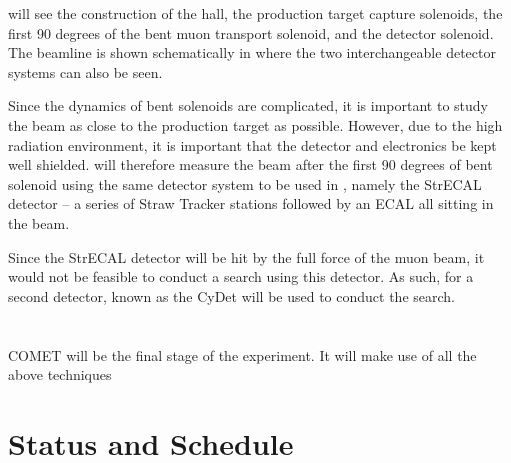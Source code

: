 \phaseI will see the construction of the \COMET hall, the production target capture solenoids, the first 90 degrees of the bent muon transport solenoid, and the detector solenoid.  
The beamline is shown schematically in  where the two interchangeable detector systems can also be seen.

Since the dynamics of bent solenoids are complicated, it is important to study the beam as close to the production target as possible.
However, due to the high radiation environment, it is important that the detector and electronics be kept well shielded.
\phaseI will therefore measure the beam after the first 90 degrees of bent solenoid using the same detector system to be used in \phaseII, namely the \ac{StrECAL} detector -- a series of Straw Tracker stations  followed by an ECAL
all sitting in the beam.  

Since the StrECAL detector will be hit by the full force of the muon beam, it would not be feasible to conduct a \mueconv search using this detector.
As such, for \phaseI a second detector, known as the \ac{CyDet} will be used to conduct the \mueconv search.


\section{\COMET \phaseII}
COMET \phaseII will be the final stage of the experiment.
It will make use of all the above techniques

\FigPhaseII

\section{Status and Schedule}
